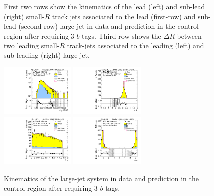 \begin{figure}[htbp!]
\begin{center}
  \caption{First two rows show the kinematics of the lead (left) and sub-lead (right) small-$R$ track jets associated to the lead (first-row) and sub-lead (second-row) large-\R jet in data and prediction in the control region after requiring 3 $b$-tags. Third row shows the $\Delta R$ between two leading small-$R$ track-jets associated to the leading (left) and sub-leading (right) large-\R jet.  }
  \label{fig:boosted-3b-control-ak2}
\end{center}
\end{figure}


\begin{figure}[htbp!]
\begin{center}
\includegraphics[width=0.32\textwidth,angle=-90]{figures/boosted/Control/b77_ThreeTag_Control_mHH_l_1.pdf}
\includegraphics[width=0.32\textwidth,angle=-90]{figures/boosted/Control/b77_ThreeTag_Control_hCandDr.pdf}\\
\includegraphics[width=0.32\textwidth,angle=-90]{figures/boosted/Control/b77_ThreeTag_Control_hCandDeta.pdf}
\includegraphics[width=0.32\textwidth,angle=-90]{figures/boosted/Control/b77_ThreeTag_Control_hCandDphi.pdf}
  \caption{Kinematics of the large-\R jet system in data and prediction in the control region after requiring 3 $b$-tags.  }
  \label{fig:boosted-3b-control-ak10-system}
\end{center}
\end{figure}


